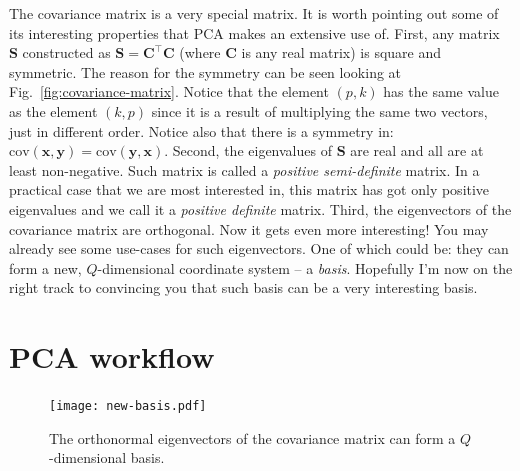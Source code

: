 \documentclass[10pt,twocolumn]{article}
\begin{document}
The covariance matrix is a very special matrix. It is worth pointing out some of its interesting properties that PCA makes an extensive use of. First, any matrix $\mathbf{S}$ constructed as $\mathbf{S} = \mathbf{C}^{\top} \mathbf{C}$ (where $\mathbf{C}$ is any real matrix) is square and symmetric. The reason for the symmetry can be seen looking at Fig.~\ref{fig:covariance-matrix}. Notice that the element $(p,k)$ has the same value as the element $(k,p)$ since it is a result of multiplying the same two vectors, just in different order. Notice also that there is a symmetry in: $\text{cov}(\mathbf{x},\mathbf{y}) = \text{cov}(\mathbf{y},\mathbf{x})$. Second, the eigenvalues of $\mathbf{S}$ are real and all are at least non-negative. Such matrix is called a \textit{positive semi-definite} matrix. In a practical case that we are most interested in, this matrix has got only positive eigenvalues and we call it a \textit{positive definite} matrix. Third, the eigenvectors of the covariance matrix are orthogonal. Now it gets even more interesting! You may already see some use-cases for such eigenvectors. One of which could be: they can form a new, $Q$-dimensional coordinate system -- a \textit{basis}. 
Hopefully I'm now on the right track to convincing you that such basis can be a very interesting basis.


\section{PCA workflow}

\begin{figure}[t]
\centering\texttt{[image: new-basis.pdf]}
\caption{The orthonormal eigenvectors of the covariance matrix can form a $Q$-dimensional basis.}
\label{fig:new-basis}
\end{figure}
\end{document}
